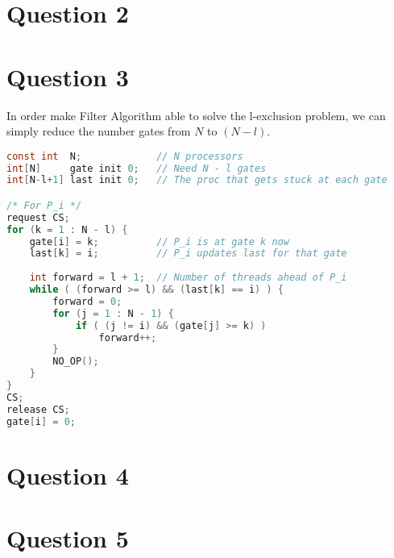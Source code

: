 \documentclass[12pt]{article}
\begin{document}
\section*{Question 2}

\section*{Question 3} 
In order make Filter Algorithm able to solve the l-exclusion problem, we can simply reduce the number gates from $N$ to $(N - l)$. 

\begin{lstlisting}[language=C] 
const int  N;             // N processors
int[N]     gate init 0;   // Need N - l gates 
int[N-l+1] last init 0;   // The proc that gets stuck at each gate

/* For P_i */ 
request CS; 
for (k = 1 : N - l) { 
	gate[i] = k;          // P_i is at gate k now 
	last[k] = i;          // P_i updates last for that gate 
	
	int forward = l + 1;  // Number of threads ahead of P_i
	while ( (forward >= l) && (last[k] == i) ) { 
	    forward = 0; 
		for (j = 1 : N - 1) { 
	    	if ( (j != i) && (gate[j] >= k) ) 
	      		forward++;  
		}
		NO_OP(); 
	}
}
CS; 
release CS; 
gate[i] = 0; 
\end{lstlisting}

\section*{Question 4} 

\section*{Question 5}  
\end{document}
